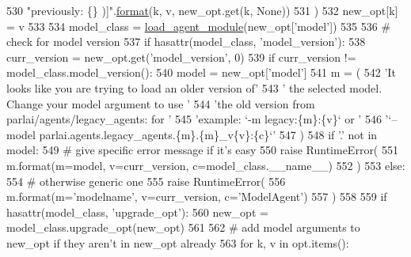 \begin{DoxyCode}
530                         \textcolor{stringliteral}{"previously: \{\} )]"}.\hyperlink{namespaceparlai_1_1chat__service_1_1services_1_1messenger_1_1shared__utils_a32e2e2022b824fbaf80c747160b52a76}{format}(k, v, new\_opt.get(k, \textcolor{keywordtype}{None}))
531                     )
532                 new\_opt[k] = v
533 
534         model\_class = \hyperlink{namespaceparlai_1_1core_1_1loader_a8e6a8f524cba24b80e9bd157c2e0ab8b}{load\_agent\_module}(new\_opt[\textcolor{stringliteral}{'model'}])
535 
536         \textcolor{comment}{# check for model version}
537         \textcolor{keywordflow}{if} hasattr(model\_class, \textcolor{stringliteral}{'model\_version'}):
538             curr\_version = new\_opt.get(\textcolor{stringliteral}{'model\_version'}, 0)
539             \textcolor{keywordflow}{if} curr\_version != model\_class.model\_version():
540                 model = new\_opt[\textcolor{stringliteral}{'model'}]
541                 m = (
542                     \textcolor{stringliteral}{'It looks like you are trying to load an older version of'}
543                     \textcolor{stringliteral}{' the selected model. Change your model argument to use '}
544                     \textcolor{stringliteral}{'the old version from parlai/agents/legacy\_agents: for '}
545                     \textcolor{stringliteral}{'example: `-m legacy:\{m\}:\{v\}` or '}
546                     \textcolor{stringliteral}{'`--model parlai.agents.legacy\_agents.\{m\}.\{m\}\_v\{v\}:\{c\}`'}
547                 )
548                 \textcolor{keywordflow}{if} \textcolor{stringliteral}{'.'} \textcolor{keywordflow}{not} \textcolor{keywordflow}{in} model:
549                     \textcolor{comment}{# give specific error message if it's easy}
550                     \textcolor{keywordflow}{raise} RuntimeError(
551                         m.format(m=model, v=curr\_version, c=model\_class.\_\_name\_\_)
552                     )
553                 \textcolor{keywordflow}{else}:
554                     \textcolor{comment}{# otherwise generic one}
555                     \textcolor{keywordflow}{raise} RuntimeError(
556                         m.format(m=\textcolor{stringliteral}{'modelname'}, v=curr\_version, c=\textcolor{stringliteral}{'ModelAgent'})
557                     )
558 
559         \textcolor{keywordflow}{if} hasattr(model\_class, \textcolor{stringliteral}{'upgrade\_opt'}):
560             new\_opt = model\_class.upgrade\_opt(new\_opt)
561 
562         \textcolor{comment}{# add model arguments to new\_opt if they aren't in new\_opt already}
563         \textcolor{keywordflow}{for} k, v \textcolor{keywordflow}{in} opt.items():

\end{DoxyCode}
